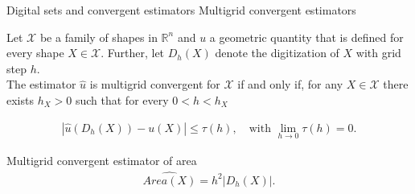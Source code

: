 \begin{frame}
\begin{minipage}[t][0.65\textheight][t]{1\textwidth}
{\begin{tabular}{ccc}
\end{tabular}}%
\end{minipage}
\end{frame}

\begin{frame}
{Digital sets and convergent estimators}
{Multigrid convergent estimators}

\begin{definition}
	Let $\mathcal{X}$ be a family of shapes in $\mathbb{R}^n$ and $u$ a geometric quantity that is defined for every shape $X \in \mathcal{X}$. Further, let $D_h(X)$ denote the digitization of $X$ with grid step $h$.\\[1em]
	 The estimator $\hat{u}$ is multigrid convergent for $\mathcal{X}$ if and only if, for any $X \in \mathcal{X}$ there exists $h_X > 0$ such that for every $0< h < h_X$
	
	\begin{align*}
		| \hat{u}(D_h(X)) - u(X) | \leq \tau(h), \quad \text{with } \lim_{h\rightarrow 0}{\tau(h)} = 0.
	\end{align*}	
\end{definition}
%
\pause
%
Multigrid convergent estimator of area
\begin{align*}
	\widehat{Area(X)} = h^2|D_h(X)|.
\end{align*}
%
\end{frame}

